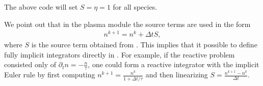 \documentclass[letterpaper,10pt,english]{sphinxmanual}
\begin{document}
\begin{sphinxVerbatim}[commandchars=\\\{\},formatcom=\scriptsize]
            
                                              
                                          
                                      
                                          
                                              
                                              
                                                  
                                                  
                                                  
                                                    
      
      
\end{sphinxVerbatim}

\sphinxAtStartPar
The above code will set \(S = \eta = 1\) for all species.

\sphinxAtStartPar
We point out that in the plasma module the source terms are  used in the form
\begin{equation*}
\begin{split}n^{k+1} = n^k + \Delta t S,\end{split}
\end{equation*}
\sphinxAtStartPar
where \(S\) is the source term obtained from .
This implies that it  possible to define fully implicit integrators directly in .
For example, if the reactive problem consisted only of \(\partial_t n = -\frac{n}{\tau}\), one could form a reactive integrator with the implicit Euler rule by first computing \(n^{k+1} = \frac{n^k}{1 + \Delta t/\tau}\) and then linearizing \(S = \frac{n^{k+1} - n^k}{\Delta t}\).
\end{document}
